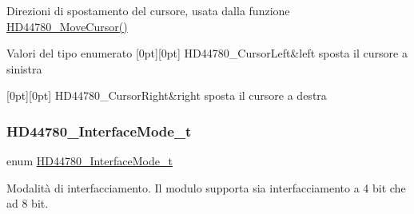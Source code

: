 Direzioni di spostamento del cursore, usata dalla funzione \hyperlink{group___h_d44780_gabcea9a03050c46530e39b7556c673baf}{H\+D44780\+\_\+\+Move\+Cursor()} 

\begin{DoxyEnumFields}{Valori del tipo enumerato}
[0pt][0pt]{}\mbox{\label{group___h_d44780_ggaf46f4db4f981d3a1088804a6d6980d30aa4d704398d4edd1e0dec8dbb55f90292}} 
H\+D44780\+\_\+\+Cursor\+Left&left sposta il cursore a sinistra \\
\hline

[0pt][0pt]{}\mbox{\label{group___h_d44780_ggaf46f4db4f981d3a1088804a6d6980d30a26006ced693b6bab28c6e30bfdb8c399}} 
H\+D44780\+\_\+\+Cursor\+Right&right sposta il cursore a destra \\
\hline

\end{DoxyEnumFields}
\mbox{\label{group___h_d44780_gaaaea8b73e24f7658da4118f6b01b45f0}} 
\subsubsection{\texorpdfstring{H\+D44780\+\_\+\+Interface\+Mode\+\_\+t}{HD44780\_InterfaceMode\_t}}
{\footnotesize\ttfamily enum \hyperlink{group___h_d44780_gaaaea8b73e24f7658da4118f6b01b45f0}{H\+D44780\+\_\+\+Interface\+Mode\+\_\+t}}



Modalità di interfacciamento. Il modulo supporta sia interfacciamento a 4 bit che ad 8 bit. 

